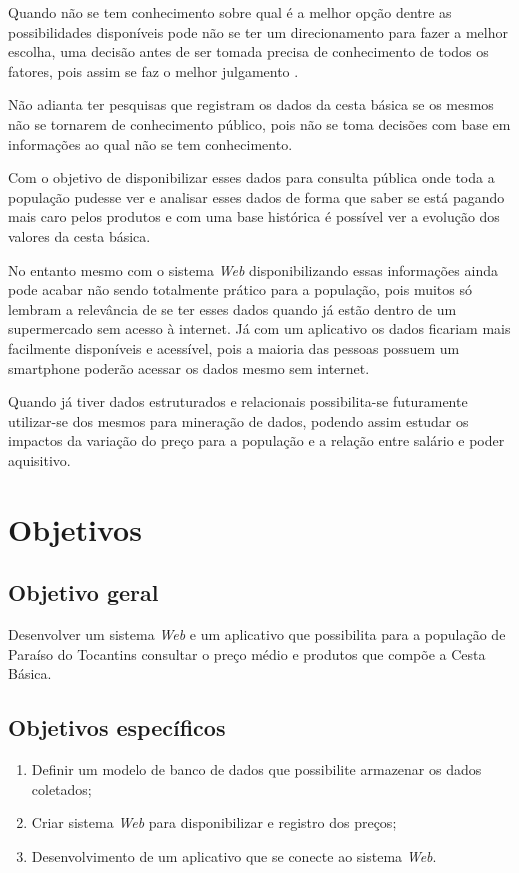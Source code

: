 \documentclass{ifto-tex}
\begin{document}
		Quando não se tem conhecimento sobre qual é a melhor opção dentre as possibilidades disponíveis pode não se ter um direcionamento para fazer a melhor escolha, uma decisão antes de ser tomada precisa de conhecimento de todos os fatores, pois assim se faz o melhor julgamento \cite{bezerra2013efeito}.

Não adianta ter pesquisas que registram os dados da cesta básica se os mesmos não se tornarem de conhecimento público, pois não se toma decisões com base em informações ao qual não se tem conhecimento.

Com o objetivo de disponibilizar esses dados para consulta pública onde toda a população pudesse ver e analisar esses dados de forma que saber se está pagando mais caro pelos produtos e com uma base histórica é possível ver a evolução dos valores da cesta básica.

No entanto mesmo com o sistema \textit{Web} disponibilizando essas informações ainda pode acabar não sendo totalmente prático para a população, pois muitos só lembram a relevância de se ter esses dados quando já estão dentro de um supermercado sem acesso à  internet. Já com um aplicativo os dados ficariam mais facilmente disponíveis e acessível, pois a maioria das pessoas possuem um smartphone poderão acessar os dados mesmo sem internet.

Quando já tiver dados estruturados e relacionais possibilita-se futuramente utilizar-se dos mesmos para mineração de dados, podendo assim estudar os impactos da variação do preço para a população e a relação entre salário e poder aquisitivo.
	
	\section{Objetivos}
	
		\subsection{Objetivo geral}
		
			Desenvolver um sistema \textit{Web} e um aplicativo que possibilita para a população de Paraíso do Tocantins consultar o preço médio e produtos que compõe a Cesta Básica.
		
		\subsection{Objetivos específicos}
		
			\begin{enumerate}
						\item Definir um modelo de banco de dados que possibilite armazenar os dados coletados;
			\item Criar sistema \textit{Web} para disponibilizar e registro dos preços;
			\item Desenvolvimento de um aplicativo que se conecte ao sistema \textit{Web}.
			\end{enumerate}
\end{document}
